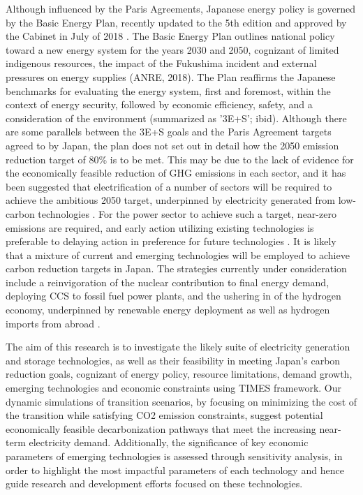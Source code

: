 Although influenced by the Paris Agreements, Japanese energy policy is governed by the Basic Energy Plan, recently updated to the 5th edition and approved by the Cabinet in July of 2018 \cite{noauthor_japans_2018}. The Basic Energy Plan outlines national policy toward a new energy system for the years 2030 and 2050, cognizant of limited indigenous resources, the impact of the Fukushima incident and external pressures on energy supplies (ANRE, 2018). The Plan reaffirms the Japanese benchmarks for evaluating the energy system, first and foremost, within the context of energy security, followed by economic efficiency, safety, and a consideration of the environment (summarized as '3E+S'; ibid). Although there are some parallels between the 3E+S goals and the Paris Agreement targets agreed to by Japan, the plan does not set out in detail how the 2050 emission reduction target of 80\% is to be met. This may be due to the lack of evidence for the economically feasible reduction of GHG emissions in each sector, and it has been suggested that electrification of a number of sectors will be required to achieve the ambitious 2050 target, underpinned by electricity generated from low-carbon technologies \cite{matsuo_quantitative_2018}. For the power sector to achieve such a target, near-zero emissions are required, and early action utilizing existing technologies is preferable to delaying action in preference for future technologies \cite{ashina_roadmap_2012}. It is likely that a mixture of current and emerging technologies will be employed to achieve carbon reduction targets in Japan. The strategies currently under consideration include a reinvigoration of the nuclear contribution to final energy demand, deploying \gls{CCS} to fossil fuel power plants, and the ushering in of the hydrogen economy, underpinned by renewable energy deployment as well as hydrogen imports from abroad \cite{ashina_roadmap_2012, matsuo_quantitative_2018, noauthor_basic_2017}. 

The aim of this research is to investigate the likely suite of electricity generation and storage technologies, as well as their feasibility in meeting Japan's carbon reduction goals, cognizant of energy policy, resource limitations, demand growth, emerging technologies and economic constraints using \gls{TIMES} framework. Our dynamic simulations of transition scenarios, by focusing on minimizing the cost of the transition while satisfying CO2 emission constraints, suggest potential economically feasible decarbonization pathways that meet the increasing near-term electricity demand. Additionally, the significance of key economic parameters of emerging technologies is assessed through sensitivity analysis, in order to highlight the most impactful parameters of each technology and hence guide research and development efforts focused on these technologies.
